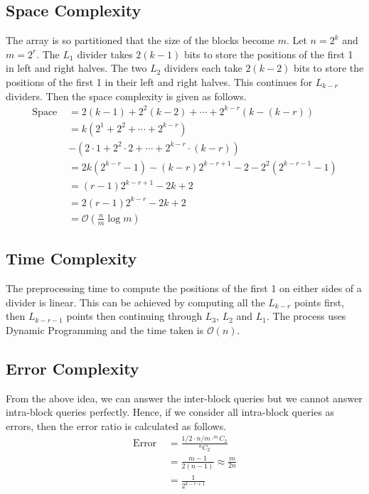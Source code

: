 \documentclass{article}
\begin{document}
\subsection{Space Complexity}
The array is so partitioned that the size of the blocks become $m$. Let $n = 2^k$ and $m = 2^r$. The $L_1$ divider takes $2(k-1)$ bits to store the positions of the first 1 in left and right halves. The two $L_2$ dividers each take $2(k-2)$ bits to store the positions of the first 1 in their left and right halves. This continues for $L_{k-r}$ dividers. Then the space complexity is given as follows.
\begin{align}
\text{Space } &= 2(k-1) + 2^2(k-2) + \cdots + 2^{k-r}(k-(k-r)) \\
&= k (2^1 + 2^2 + \cdots + 2^{k-r}) \\
&- \left( 2 \cdot 1 + 2^2 \cdot 2 + \cdots + 2^{k-r} \cdot (k-r) \right) \\
&= 2k(2^{k-r}-1) - (k-r)2^{k-r+1}-2-2^2(2^{k-r-1}-1) \\
&= (r-1)2^{k-r+1}-2k+2 \\
&=2(r-1)2^{k-r}-2k+2\\
&= \mathcal{O} \left( \frac{n}{m} \log m \right)
\end{align}

\subsection{Time Complexity}
The preprocessing time to compute the positions of the first 1 on either sides of a divider is linear. This can be achieved by computing all the $L_{k-r}$ points first, then $L_{k-r-1}$ points then continuing through $L_3$, $L_2$ and $L_1$. The process uses Dynamic Programming and the time taken is $\mathcal{O} (n)$.

\subsection{Error Complexity}
From the above idea, we can answer the inter-block queries but we cannot answer intra-block queries perfectly. Hence, if we consider all intra-block queries as errors, then the error ratio is calculated as follows.
\begin{align}
\text{Error } &= \frac{1/2 \cdot n/m \cdot ^mC_2}{^nC_2} \\
&= \frac{m-1}{2(n-1)} \approx \frac{m}{2n}\\
&= \frac{1}{2^{k-r+1}}
\end{align}
\end{document}
